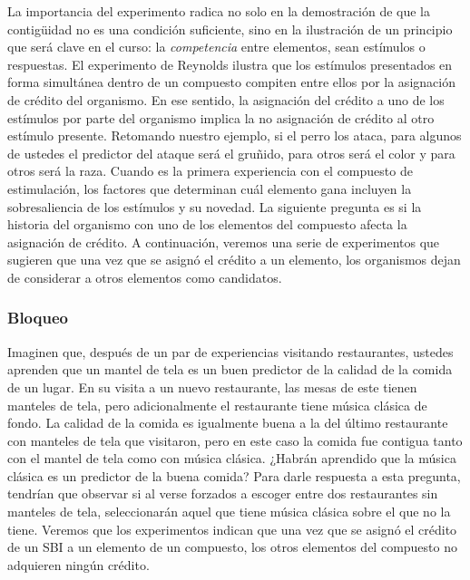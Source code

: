 \documentclass[
  letterpaper,
]{book}
\begin{document}
La importancia del experimento radica no solo en la demostración de que
la contigüidad no es una condición suficiente, sino en la ilustración de
un principio que será clave en el curso: la \emph{competencia} entre
elementos, sean estímulos o respuestas. El experimento de Reynolds
ilustra que los estímulos presentados en forma simultánea dentro de un
compuesto compiten entre ellos por la asignación de crédito del
organismo. En ese sentido, la asignación del crédito a uno de los
estímulos por parte del organismo implica la no asignación de crédito al
otro estímulo presente. Retomando nuestro ejemplo, si el perro los
ataca, para algunos de ustedes el predictor del ataque será el gruñido,
para otros será el color y para otros será la raza. Cuando es la primera
experiencia con el compuesto de estimulación, los factores que
determinan cuál elemento gana incluyen la sobresaliencia de los
estímulos y su novedad. La siguiente pregunta es si la historia del
organismo con uno de los elementos del compuesto afecta la asignación de
crédito. A continuación, veremos una serie de experimentos que sugieren
que una vez que se asignó el crédito a un elemento, los organismos dejan
de considerar a otros elementos como candidatos.

\subsubsection{Bloqueo}\label{bloqueo}

Imaginen que, después de un par de experiencias visitando restaurantes,
ustedes aprenden que un mantel de tela es un buen predictor de la
calidad de la comida de un lugar. En su visita a un nuevo restaurante,
las mesas de este tienen manteles de tela, pero adicionalmente el
restaurante tiene música clásica de fondo. La calidad de la comida es
igualmente buena a la del último restaurante con manteles de tela que
visitaron, pero en este caso la comida fue contigua tanto con el mantel
de tela como con música clásica. ¿Habrán aprendido que la música clásica
es un predictor de la buena comida? Para darle respuesta a esta
pregunta, tendrían que observar si al verse forzados a escoger entre dos
restaurantes sin manteles de tela, seleccionarán aquel que tiene música
clásica sobre el que no la tiene. Veremos que los experimentos indican
que una vez que se asignó el crédito de un SBI a un elemento de un
compuesto, los otros elementos del compuesto no adquieren ningún
crédito.
\end{document}
